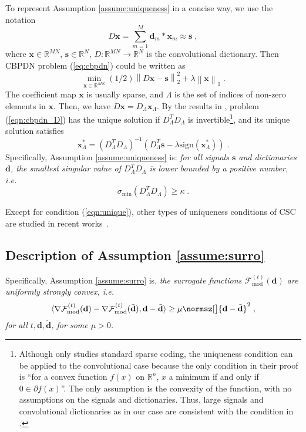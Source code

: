 \documentclass[final]{siamart1116}
\newcommand{\mb}[1]{\mathbf{#1}}
\providecommand{\norm}[1]{\left\lVert#1\right\rVert}
\def \R  {\mathbb{R}}
\def \F  {\mathcal{F}}
\begin{document}
To represent Assumption \ref{assume:uniqueness} in a concise way, we use the  notation
\[
D \mb{x} = \sum_{m=1}^M \mb{d}_m \ast \mb{x}_{m} \approx \mb{s} \;,
\]
where $\mb{x}\in\R^{MN}$, $\mb{s}\in\R^{N}$, $D: \R^{MN}\to\R^{N}$ is the convolutional dictionary. Then CBPDN problem (\ref{eq:cbpdn}) could be written as
\begin{equation}
\label{eqn:cbpdn_D}
\min_{\mb{x}\in\R^{MN}} (1/2)\norm{D\mb{x}-\mb{s}}_2^2 + \lambda \norm{\mb{x}}_1 \;.
\end{equation}
The coefficient map $\mb{x}$ is usually sparse, and $\Lambda$ is the set of indices of non-zero elements in $\mb{x}$. Then, we have
$D\mb{x} = D_{\Lambda}\mb{x}_{\Lambda}$.
By the results in \cite{fuchs2005recovery}, problem (\ref{eqn:cbpdn_D}) has the unique solution if $D_{\Lambda}^TD_{\Lambda}$ is invertible\footnote{Although \cite{fuchs2005recovery} only studies standard sparse coding, the uniqueness condition can be applied to the convolutional case because the only condition in their proof is ``for a  convex function $f(x)$ on $\R^n$, $x$ a minimum if and only if $0\in \partial f(x)$''. The only assumption is the convexity of the function, with no assumptions on the signals and dictionaries. Thus, large signals and convolutional dictionaries as in our case are consistent with the condition in \cite{fuchs2005recovery}.}, and its unique solution satisfies
\begin{equation}
\label{eqn:uniquesln}
\mb{x}^*_{\Lambda} = (D_{\Lambda}^TD_{\Lambda})^{-1}(D_{\Lambda}^T\mb{s} - \lambda \text{sign}(\mb{x}^*_{\Lambda})) \;.
\end{equation}
Specifically, Assumption \ref{assume:uniqueness} is: \emph{for all signals $\mb{s}$ and dictionaries $\mb{d}$, the smallest singular value of $D_{\Lambda}^TD_{\Lambda}$ is lower bounded by a positive number, i.e.}
\begin{equation}
\label{eqn:unique}
\sigma_{\text{min}}(D_{\Lambda}^TD_{\Lambda}) \geq \kappa \;.
\end{equation}

Except for condition (\ref{eqn:unique}), other types of uniqueness conditions of CSC are studied in recent works~\cite{papyan2017convolutional2, papyan2017working, sulam2017multi}.


\subsection{Description of Assumption \ref{assume:surro}}

Specifically, Assumption \ref{assume:surro} is, \emph{the surrogate functions $\F^{(t)}_{\mathrm{mod}}(\mb{d})$ are uniformly strongly convex, i.e.}
\begin{equation}
\label{eqn:strong-convex}
\langle  \nabla \F^{(t)}_{\mathrm{mod}}(\mb{d}) - \nabla \F^{(t)}_{\mathrm{mod}}(\tilde{\mb{d}})  , \mb{d} - \tilde{\mb{d}}\rangle \geq \mu \normsz[\big]{ \mb{d} - \tilde{\mb{d}} }^2 \;,
\end{equation}
\emph{for all $t, \mb{d},\tilde{\mb{d}}$, for some $\mu > 0$.}
\end{document}
